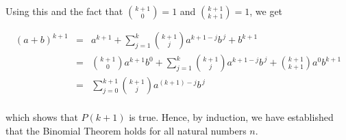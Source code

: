Using this and the fact that $\binom{k+1}{0} = 1$ and $\binom{k+1}{k+1} = 1$, we get

\[ \begin{array}{rcl}

(a+b)^{k+1} & = & a^{k+1} + \displaystyle{\sum_{j=1}^{k} \binom{k+1}{j} a^{k+1-j} b^{\, j} } + b^{k+1} \\ [15pt]
            & = & \displaystyle{ \binom{k+1}{0} a^{k+1} b^{0} + \sum_{j=1}^{k} \binom{k+1}{j} a^{k+1-j} b^{\, j}  + \binom{k+1}{k+1} a^{0} b^{k+1}} \\ [15pt]
            & = & \displaystyle{  \sum_{j=0}^{k+1} \binom{k+1}{j} a^{(k+1)-j} b^{\, j}} \\ [15pt]
 \end{array}\]
 
which shows that $P(k+1)$ is true.  Hence, by induction, we have established that the Binomial Theorem holds for all natural numbers $n$.

